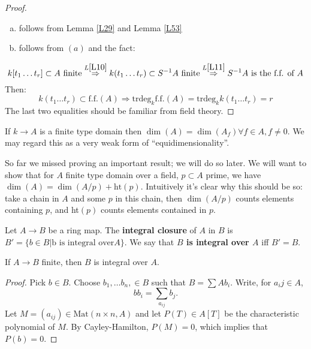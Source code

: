 \documentclass{../mathnotes}
\begin{document}
\begin{proof}\hspace{1mm}
\begin{enumerate} [(a)]
\item follows from Lemma \ref{L29} and Lemma \ref{L53}
\item follows from $(a)$ and the fact:
\end{enumerate}
\[       k[t_1 \dots t_r] \subset A \text{ finite}  \overset{L \ref{L10}}{\Rightarrow}  k(t_1 \dots t_r) \subset S^{-1}A \text{ finite}   \overset{L \ref{L11}}{\Rightarrow} S^{-1}A \text{ is the f.f. of } A \]
Then:
\[     k(t_1 \dots t_r) \subset \text{f.f.}(A)  \Rightarrow \text{trdeg}_k \text{f.f.}(A) = \text{trdeg}_k k(t_1 \dots t_r) = r     \]
The last two equalities should be familiar from field theory.
\end{proof}

\begin{rem}
If $k\to A$ is a finite type domain then $\dim(A) = \dim(A_f) \forall f\in A, f\neq 0$. We may regard this as a very weak form of ``equidimensionality''.
\end{rem}
\begin{rem}
So far we missed proving an important result; we will do so later. We will want to show that for $A$ finite type domain over a field, $p \subset A$ prime, we have $\dim(A) = \dim(A/p) + \text{ht}(p)$. Intuitively it's clear why this should be so: take a chain in $A$ and some $p$ in this chain, then $\dim(A/p)$ counts elements containing $p$, and ht$(p)$ counts elements contained in $p$.
\end{rem}

\begin{defn}
Let $A\to B$ be a ring map. The \textbf{integral closure} of $A$ in $B$ is $B' = \{b\in B | \text{b is integral over} A\}$. We say that \textbf{$B$ is integral over $A$} iff $B'=B$.
\end{defn}

\begin{lem}
\label{L55}
If $A\to B$ finite, then $B$ is integral over $A$.
\end{lem}

\begin{proof}
Pick $b\in B$. Choose $b_1, \dots b_n, \in B$ such that $B = \sum A b_i$. 
Write, for $a_ij\in A$,
\[bb_i=\sum_{a_{ij}}b_j.\]
Let $M=(a_{ij})\in\text{Mat}(n\times n, A)$ and let $P(T)\in A[T]$ be the characteristic polynomial of $M$. By Cayley-Hamilton, $P(M)=0$, which implies that $P(b)=0$.
\end{proof}
\end{document}
